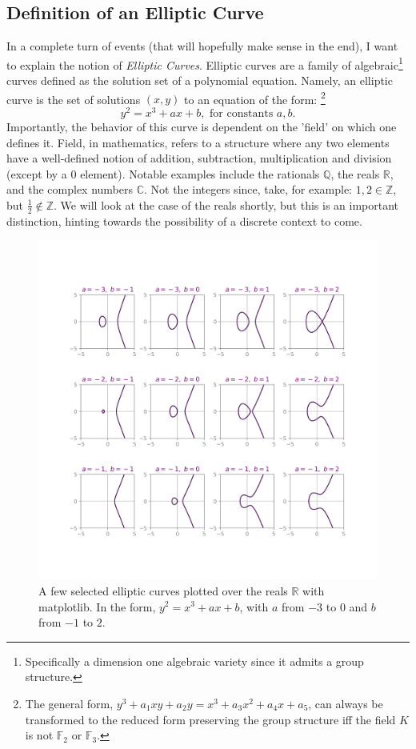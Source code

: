\documentclass[11pt, a4paper]{report}
\newcommand{\integers}{\mathbb{Z}}
\newcommand{\rationals}{\mathbb{Q}}
\newcommand{\reals}{\mathbb{R}}
\newcommand{\complexes}{\mathbb{C}}
\newcommand{\field}{\mathbb{F}}
\begin{document}
\subsection{Definition of an Elliptic Curve}
In a complete turn of events (that will hopefully make sense in the end), I want to explain the notion of \textit{Elliptic Curves}. Elliptic curves are a family of  algebraic\footnote{Specifically a dimension one algebraic variety since it admits a group structure.} curves defined as the solution set of a polynomial equation. Namely, an elliptic curve is the set of solutions $(x,y)$ to an equation of the form:\autocite[10]{koblitz} \footnote{The general form, $y^3 + a_1xy + a_2y = x^3 + a_3x^2 + a_4x + a_5$, can always be transformed to the reduced form preserving the group structure iff the field $K$ is not $\field_2$ or $\field_3$.}
\[y^2 = x^3 + ax + b, \text{ for constants } a,b.\]
Importantly, the behavior of this curve is dependent on the 'field' on which one defines it. Field, in mathematics, refers to a structure where any two elements have a well-defined notion of addition, subtraction, multiplication and division (except by a 0 element). Notable examples include the rationals $\rationals$, the reals $\reals$, and the complex numbers $\complexes$. Not the integers since, take, for example: $1, 2 \in \integers$, but $\frac{1}{2} \notin \integers$. We will look at the case of the reals shortly, but this is an important distinction, hinting towards the possibility of a discrete context to come.

\begin{figure}[ht]
\begin{center}
\includegraphics[width=.9\linewidth]{elliptic_curves.png} 
\caption{A few selected elliptic curves plotted over the reals $\reals$ with matplotlib. In the form, $y^2 = x^3+ax+b$, with $a$ from $-3$ to $0$ and $b$ from  $-1$ to $2$.}
\label{fig:realECs}
\end{center}
\end{figure}
\end{document}
